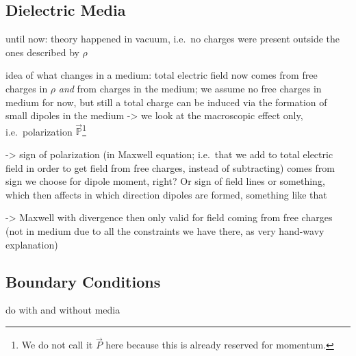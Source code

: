 \documentclass[../class_mech_main.tex]{subfiles}
\begin{document}
        \subsection{Dielectric Media}

until now: theory happened in vacuum, i.e.~no charges were present outside the ones described by $\rho$

idea of what changes in a medium: total electric field now comes from free charges in $\rho$ \emph{and} from charges in the medium; we assume no free charges in medium for now, but still a total charge can be induced via the formation of small dipoles in the medium -> we look at the macroscopic effect only, i.e.~polarization $\vec{\mathbb{P}}$\footnote{We do not call it $\vec{P}$ here because this is already reserved for momentum.}

-> sign of polarization (in Maxwell equation; i.e.~that we add to total electric field in order to get field from free charges, instead of subtracting) comes from sign we choose for dipole moment, right? Or sign of field lines or something, which then affects in which direction dipoles are formed, something like that

-> Maxwell with divergence then only valid for field coming from free charges (not in medium due to all the constraints we have there, as very hand-wavy explanation)



        \subsection{Boundary Conditions}

do with and without media
\end{document}

